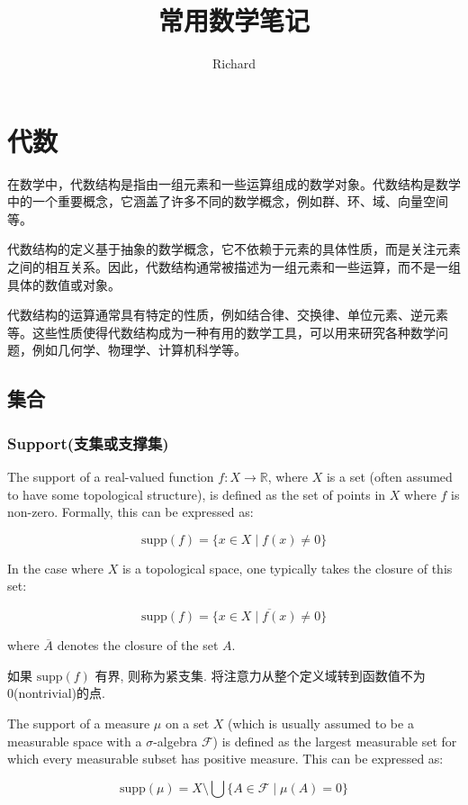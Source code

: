 \documentclass[UTF8,a4paper,11pt]{article}
\title{常用数学笔记}
\author{Richard}
\begin{document}
\maketitle
\tableofcontents
\newpage

\section{代数}
在数学中，代数结构是指由一组元素和一些运算组成的数学对象。代数结构是数学中的一个重要概念，它涵盖了许多不同的数学概念，例如群、环、域、向量空间等。

代数结构的定义基于抽象的数学概念，它不依赖于元素的具体性质，而是关注元素之间的相互关系。因此，代数结构通常被描述为一组元素和一些运算，而不是一组具体的数值或对象。

代数结构的运算通常具有特定的性质，例如结合律、交换律、单位元素、逆元素等。这些性质使得代数结构成为一种有用的数学工具，可以用来研究各种数学问题，例如几何学、物理学、计算机科学等。
\subsection{集合}
\subsubsection{Support(支集或支撑集)}
The support of a real-valued function $f: X \rightarrow \mathbb{R}$, where $X$ is a set (often assumed to have some topological structure), is defined as the set of points in $X$ where $f$ is non-zero. Formally, this can be expressed as:

\[ \text{supp}(f) = \{ x \in X \mid f(x) \neq 0 \} \]

In the case where $X$ is a topological space, one typically takes the closure of this set:

\[ \text{supp}(f) = \overline{\{ x \in X \mid f(x) \neq 0 \}} \]

where $\overline{A}$ denotes the closure of the set $A$.

如果 $\text{supp}(f)$ 有界, 则称为紧支集. 将注意力从整个定义域转到函数值不为0(nontrivial)的点.

The support of a measure $\mu$ on a set $X$ (which is usually assumed to be a measurable space with a $\sigma$-algebra $\mathcal{F}$) is defined as the largest measurable set for which every measurable subset has positive measure. This can be expressed as:

\[ \text{supp}(\mu) = X \setminus \bigcup \{ A \in \mathcal{F} \mid \mu(A) = 0 \} \]
\end{document}
